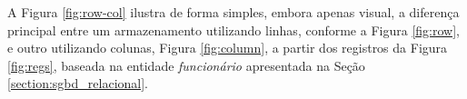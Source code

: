 A Figura \ref{fig:row-col} ilustra de forma simples, embora apenas visual, 
a diferença principal entre um armazenamento utilizando linhas, conforme a Figura \ref{fig:row}, e outro utilizando 
colunas, Figura \ref{fig:column}, a partir dos registros da Figura \ref{fig:regs}, baseada na entidade \textit{funcionário} apresentada na Seção \ref{section:sgbd_relacional}.


